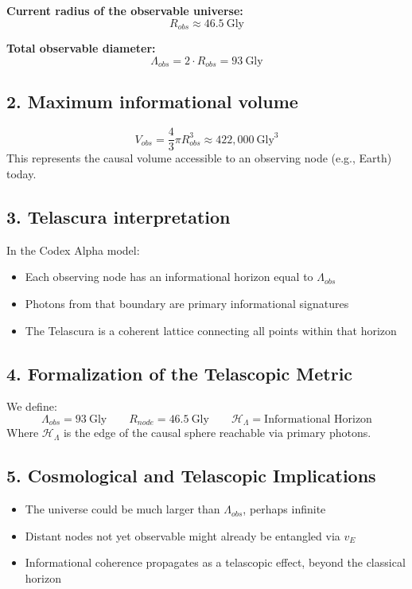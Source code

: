 \documentclass[12pt]{article}
\begin{document}
\textbf{Current radius of the observable universe:}
\begin{equation}
    R_{obs} \approx 46.5~\text{Gly}
\end{equation}

\textbf{Total observable diameter:}
\begin{equation}
    \Lambda_{obs} = 2 \cdot R_{obs} = \boxed{93~\text{Gly}}
\end{equation}

\subsection*{2. Maximum informational volume}
\begin{equation}
    V_{obs} = \frac{4}{3} \pi R_{obs}^3 \approx 422{,}000~\text{Gly}^3
\end{equation}
This represents the causal volume accessible to an observing node (e.g., Earth) today.

\subsection*{3. Telascura interpretation}
In the Codex Alpha model:
\begin{itemize}
    \item Each observing node has an informational horizon equal to $\Lambda_{obs}$
    \item Photons from that boundary are primary informational signatures
    \item The Telascura is a coherent lattice connecting all points within that horizon
\end{itemize}
\subsection*{4. Formalization of the Telascopic Metric}
We define:
\begin{equation}
    \Lambda_{obs} = 93~\text{Gly} \qquad R_{node} = 46.5~\text{Gly} \qquad \mathcal{H}_\Lambda = \text{Informational Horizon}
\end{equation}
Where $\mathcal{H}_\Lambda$ is the edge of the causal sphere reachable via primary photons.

\subsection*{5. Cosmological and Telascopic Implications}
\begin{itemize}
    \item The universe could be much larger than $\Lambda_{obs}$, perhaps infinite
    \item Distant nodes not yet observable might already be entangled via $v_E$
    \item Informational coherence propagates as a telascopic effect, beyond the classical horizon
\end{itemize}
\end{document}

